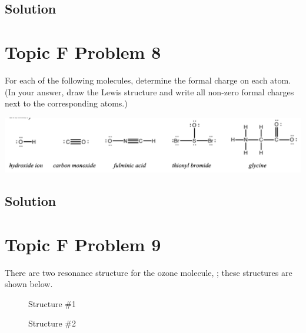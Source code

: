 \documentclass[10pt]{article}
\begin{document}
        \subsection{Solution}


    \pagebreak
    \section{Topic F Problem 8}
        For each of the following molecules, determine the formal charge on each atom. 
        (In your answer, draw the Lewis structure and write all non-zero formal charges next to the corresponding atoms.)
        \begin{center}
            \includegraphics[width=\textwidth]{img-F8.png}
        \end{center}
        
        \subsection{Solution}


    \pagebreak
    \section{Topic F Problem 9}
        There are two resonance structure for the ozone molecule, ; these structures are shown below.
        \begin{center}
            \begin{multicols}{2}
                \begin{figure}[H]
                    \centering
                    \caption{Structure \#1}
                \end{figure}
                
                \begin{figure}[H]
                    \centering
                    \caption{Structure \#2}
                \end{figure}
            \end{multicols}
        \end{center}
\end{document}
